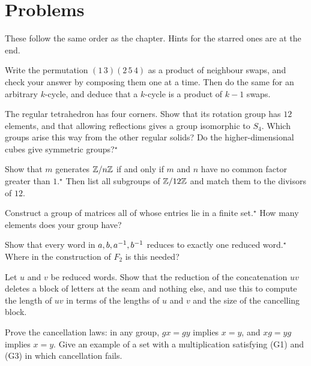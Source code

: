 \section{Problems}

These follow the same order as the chapter. Hints for the starred ones are at the end.

\begin{prob}
Write the permutation $(1\,3)(2\,5\,4)$ as a product of neighbour swaps, and check your answer by
composing them one at a time. Then do the same for an arbitrary $k$-cycle, and deduce that a
$k$-cycle is a product of $k-1$ swaps.
\end{prob}

\begin{prob}
The regular tetrahedron has four corners. Show that its rotation group has $12$ elements, and that
allowing reflections gives a group isomorphic to $S_4$. Which groups arise this way from the other
regular solids? Do the higher-dimensional cubes give symmetric groups?$^\star$
\end{prob}

\begin{prob}
Show that $m$ generates $\mathbb{Z}/n\mathbb{Z}$ if and only if $m$ and $n$ have no common factor greater than
$1$.$^\star$ Then list all subgroups of $\mathbb{Z}/12\mathbb{Z}$ and match them to the divisors of $12$.
\end{prob}

\begin{prob}
Construct a group of matrices all of whose entries lie in a finite set.$^\star$ How many elements
does your group have?
\end{prob}

\begin{prob}
Show that every word in $a,b,a^{-1},b^{-1}$ reduces to exactly one reduced word.$^\star$ Where in the
construction of $F_2$ is this needed?
\end{prob}

\begin{prob}
Let $u$ and $v$ be reduced words. Show that the reduction of the concatenation $uv$ deletes a block
of letters at the seam and nothing else, and use this to compute the length of $uv$ in terms of the
lengths of $u$ and $v$ and the size of the cancelling block.
\end{prob}

\begin{prob}
Prove the cancellation laws: in any group, $gx=gy$ implies $x=y$, and $xg=yg$ implies $x=y$. Give an
example of a set with a multiplication satisfying (G1) and (G3) in which cancellation fails.
\end{prob}

